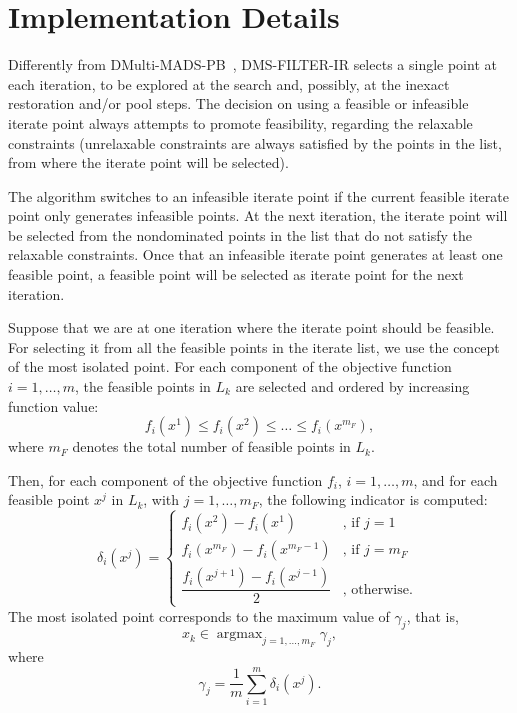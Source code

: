 \documentclass[12pt]{article}
\DeclareMathOperator*{\argmax}{argmax}
\begin{document}

\section{Implementation Details}
\label{sec:implementation}

Differently from DMulti-MADS-PB~\cite{bigeon2022}, DMS-FILTER-IR
selects a single point at each iteration, to be explored at the
search and, possibly, at the inexact restoration and/or pool
steps. The decision on using a feasible or infeasible iterate
point always attempts to promote feasibility, regarding the
relaxable constraints (unrelaxable constraints are always
satisfied by the points in the list, from where the iterate point
will be selected).

The algorithm switches to an infeasible iterate point if the
current feasible iterate point only generates infeasible points.
At the next iteration, the iterate point will be selected from the
nondominated points in the list that do not satisfy the relaxable
constraints. Once that an infeasible iterate point generates at
least one feasible point, a feasible point will be selected as
iterate point for the next iteration.

Suppose that we are at one iteration where the iterate point
should be feasible. For selecting it from all the feasible points
in the iterate list, we use the concept of the most isolated
point. For each component of the objective function
$i=1,\ldots,m$, the feasible points in $L_k$ are selected and
ordered by increasing function value:
$$f_i(x^1)\leq f_i(x^2)\leq\ldots\leq f_i(x^{m_F}),$$ where $m_F$
denotes the total number of feasible points in $L_k$.

Then, for each component of the objective function $f_i$,
$i=1,\ldots,m$, and for each feasible point $x^j$ in $L_k$, with
$j=1,\ldots,m_F$, the following indicator is computed:
\begin{equation*}
\delta_{i}\left(x^{j}\right)= \begin{cases}
f_{i}\left(x^{2}\right)-f_{i}\left(x^{1}\right) & \text {, if }
j=1
\\ f_{i}\left(x^{m_F}\right)-f_{i}\left(x^{m_F-1}\right) & \text {, if } j=m_F \\
\dfrac{f_{i}\left(x^{j+1}\right)-f_{i}\left(x^{j-1}\right)}{2} &
\text {, otherwise. }\end{cases}
\end{equation*}
The most isolated point corresponds to the maximum value of
$\gamma_j$, that is, $$x_k \in\displaystyle
\argmax_{j=1,\ldots,m_F} \gamma_j,$$ where
\begin{equation}
\gamma_{j} = \displaystyle \dfrac{1}{m}\sum_{i=1}^{m}
\delta_i(x^j).
\end{equation}
\end{document}
